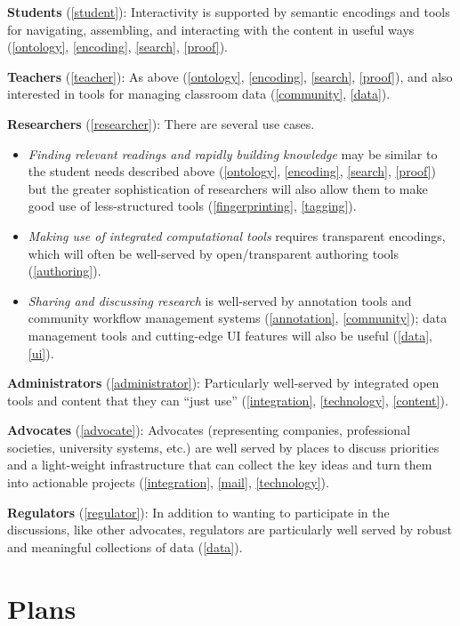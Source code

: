 \documentclass{article}
\begin{document}
\textbf{Students} (\ref{student}): Interactivity is supported by semantic encodings and tools for navigating, assembling, and interacting with the content in useful ways (\ref{ontology}, \ref{encoding}, \ref{search}, \ref{proof}).

\textbf{Teachers} (\ref{teacher}): As above (\ref{ontology}, \ref{encoding}, \ref{search}, \ref{proof}), and also interested in tools for managing classroom data (\ref{community}, \ref{data}).

\textbf{Researchers} (\ref{researcher}): There are several use cases. 
\begin{itemize}
\item \emph{Finding relevant readings and rapidly building knowledge} may be similar to the student needs described above (\ref{ontology}, \ref{encoding}, \ref{search}, \ref{proof}) but the greater sophistication of researchers will also allow them to make good use of less-structured tools (\ref{fingerprinting}, \ref{tagging}).
\item \emph{Making use of integrated computational tools} requires transparent encodings, which will often be well-served by open/transparent authoring tools (\ref{authoring}).
\item \emph{Sharing and discussing research} is well-served by annotation tools and community workflow management systems (\ref{annotation}, \ref{community}); data management tools and cutting-edge UI features will also be useful (\ref{data}, \ref{ui}).
\end{itemize}

\textbf{Administrators} (\ref{administrator}): Particularly well-served by integrated open tools and content that they can ``just use'' (\ref{integration}, \ref{technology}, \ref{content}).

\textbf{Advocates} (\ref{advocate}): Advocates (representing companies, professional societies, university systems, etc.) are well served by places to discuss priorities and a light-weight infrastructure that can collect the key ideas and turn them into actionable projects (\ref{integration}, \ref{mail}, \ref{technology}).

\textbf{Regulators} (\ref{regulator}): In addition to wanting to participate in the discussions, like other advocates, regulators are particularly well served by robust and meaningful collections of data (\ref{data}).

\section{Plans}
\end{document}
